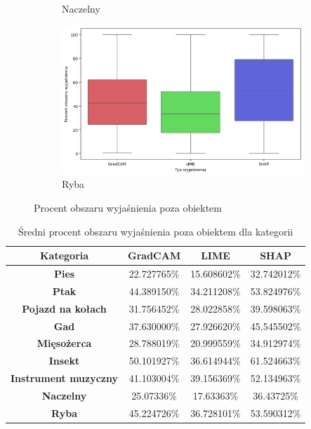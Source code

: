 \begin{figure}[h]
\begin{subfigure}[b]{0.3\textwidth}
		\caption{Naczelny}
	\end{subfigure}
	\begin{subfigure}[b]{0.3\textwidth}
		\centering\includegraphics[width=.9\textwidth]{img/areaincorrect_fish}
		\caption{Ryba}
	\end{subfigure}
	\caption{Procent obszaru wyjaśnienia poza obiektem}
	\label{rys:areaincorrect_category}
\end{figure}

\begin{table}[h]
	\centering
	\begin{tabular}{|c|c|c|c|}
		\hline
		\textbf{Kategoria}           & \textbf{GradCAM} & \textbf{LIME} & \textbf{SHAP} \\
		\hline
		\textbf{Pies}                & 22.727765\%      & 15.608602\%   & 32.742012\%   \\
		\hline
		\textbf{Ptak}                & 44.389150\%      & 34.211208\%   & 53.824976\%   \\
		\hline
		\textbf{Pojazd na kołach}    & 31.756452\%      & 28.022858\%   & 39.598063\%   \\
		\hline
		\textbf{Gad}                 & 37.630000\%      & 27.926620\%   & 45.545502\%   \\
		\hline
		\textbf{Mięsożerca}          & 28.788019\%      & 20.999559\%   & 34.912974\%   \\
		\hline
		\textbf{Insekt}              & 50.101927\%      & 36.614944\%   & 61.524663\%   \\
		\hline
		\textbf{Instrument muzyczny} & 41.103004\%      & 39.156369\%   & 52.134963\%   \\
		\hline
		\textbf{Naczelny}            & 25.07336\%       & 17.63363\%    & 36.43725\%    \\
		\hline
		\textbf{Ryba}                & 45.224726\%      & 36.728101\%   & 53.590312\%   \\
		\hline
	\end{tabular}
	\caption{Średni procent obszaru wyjaśnienia poza obiektem dla kategorii}
	\label{tab:areaincorrect_category}
\end{table}


